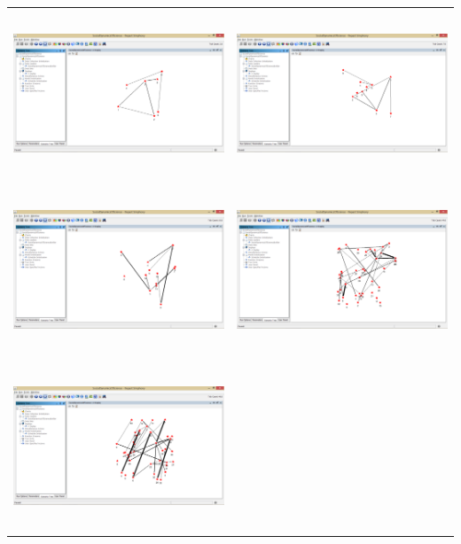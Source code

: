 \begin{table}
\begin{tabular}{cc}
\includegraphics[height= 5cm, width=8cm]{project/images/1.png}
&
\includegraphics[height= 5cm, width=8cm]{project/images/2.png}
\\ 
\includegraphics[height= 5cm, width=8cm]{project/images/3.png}
&
\includegraphics[height= 5cm, width=8cm]{project/images/4.png}
\\ 
\includegraphics[height= 5cm, width=8cm]{project/images/5.png}

\end{tabular}
\end{table}
